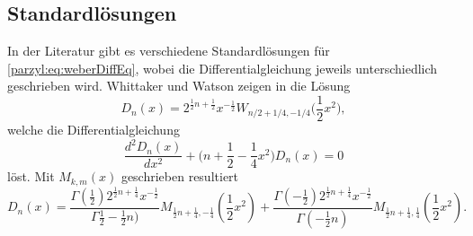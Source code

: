 \subsection{Standardlösungen}
In der Literatur gibt es verschiedene Standardlösungen für 
\eqref{parzyl:eq:weberDiffEq}, wobei die Differentialgleichung jeweils 
unterschiedlich geschrieben wird.
Whittaker und Watson zeigen in \cite{parzyl:whittaker} die Lösung
\begin{equation}
    D_n(x)
	=
	2^{\frac{1}{2}n + \frac{1}{2}} x^{-\frac{1}{2}}
	W_{n/2 + 1/4, -1/4}\biggl(\frac{1}{2}x^2\biggr),
\end{equation}
welche die Differentialgleichung
\begin{equation}
    \frac{d^2D_n(x)}{dx^2} + \biggl(n + \frac{1}{2} - \frac{1}{4} x^2\biggr)D_n(x) = 0
\end{equation}
löst.
Mit $M_{k,m}(x)$ geschrieben resultiert
\begin{equation}
    D_n(x) = \frac{
            \Gamma ( {\textstyle \frac{1}{2}}) 2^{\frac{1}{2}n + \frac{1}{4}} x^{-\frac{1}{2}}
        }{
            \Gamma {\textstyle \frac{1}{2}} - {\textstyle \frac{1}{2}} n )
        }
        M_{\frac{1}{2} n + \frac{1}{4}, - \frac{1}{4}} \left(\frac{1}{2}x^2\right)
        +
        \frac{
            \Gamma(-{\textstyle \frac{1}{2}}) 2^{\frac{1}{2}n + \frac{1}{4}} x^{-\frac{1}{2}}
        }{
            \Gamma(- {\textstyle \frac{1}{2}} n)
        }
        M_{\frac{1}{2} n + \frac{1}{4}, \frac{1}{4}} \left(\frac{1}{2}x^2\right).
\end{equation}


